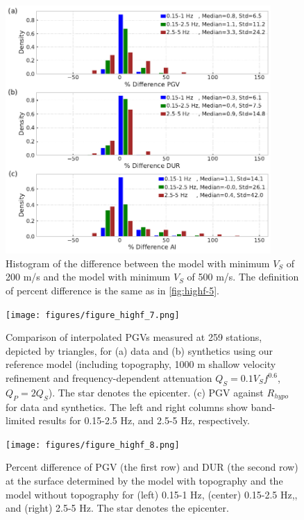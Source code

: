 \begin{figure}[!ht]
  \centering
  \includegraphics[width=0.9\textwidth,height=0.9\textheight,keepaspectratio]{figures/figure_highf_6.pdf}
  \caption{Histogram of the difference between the model with minimum $V_S$ of 200 m/s and the model with minimum $V_S$ of 500 m/s. The definition of percent difference is the same as in \cref{fig:highf-5}.
  }
  \label{fig:highf-6}
\end{figure}
\clearpage

\begin{figure}[!ht]
  \centering
  \texttt{[image: figures/figure\_highf\_7.png]}
  \caption{Comparison of interpolated PGVs measured at 259 stations, depicted by triangles, for (a) data and (b) synthetics using our reference model (including topography, 1000 m shallow velocity refinement and frequency-dependent attenuation $Q_S=0.1V_Sf^{0.6}$, $Q_P=2Q_S$). The star denotes the epicenter. (c) PGV against $R_{hypo}$ for data and synthetics. The left and right columns show band-limited results for 0.15-2.5 Hz, and 2.5-5 Hz, respectively.
  }
  \label{fig:highf-7}
\end{figure}
\clearpage

\begin{figure}[!ht]
  \centering
  \texttt{[image: figures/figure\_highf\_8.png]}
  \caption{Percent difference of PGV (the first row) and DUR (the second row) at the surface determined by the model with topography and the model without topography for (left) 0.15-1 Hz, (center) 0.15-2.5 Hz,, and (right) 2.5-5 Hz. The star denotes the epicenter.
  }
  \label{fig:highf-8}
\end{figure}
\clearpage

